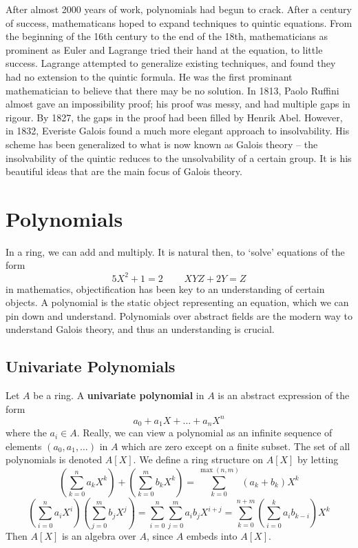 After almost 2000 years of work, polynomials had begun to crack. After a century of success, mathematicans hoped to expand techniques to quintic equations. From the beginning of the 16th century to the end of the 18th, mathematicians as prominent as Euler and Lagrange tried their hand at the equation, to little success. Lagrange attempted to generalize existing techniques, and found they had no extension to the quintic formula. He was the first prominant mathematician to believe that there may be no solution. In 1813, Paolo Ruffini almost gave an impossibility proof; his proof was messy, and had multiple gaps in rigour. By 1827, the gaps in the proof had been filled by Henrik Abel. However, in 1832, Everiste Galois found a much more elegant approach to insolvability. His scheme has been generalized to what is now known as Galois theory -- the insolvability of the quintic reduces to the unsolvability of a certain group. It is his beautiful ideas that are the main focus of Galois theory.









\chapter{Polynomials}

In a ring, we can add and multiply. It is natural then, to `solve' equations of the form
%
\[ 5 X^2 + 1 = 2\ \ \ \ \ \ \ \ \ \ XYZ + 2Y = Z \]
%
in mathematics, objectification has been key to an understanding of certain objects. A polynomial is the static object representing an equation, which we can pin down and understand. Polynomials over abstract fields are the modern way to understand Galois theory, and thus an understanding is crucial.

\section{Univariate Polynomials}

Let $A$ be a ring. A {\bf univariate polynomial} in $A$ is an abstract expression of the form
%
\[ a_0 + a_1 X + \dots + a_n X^n \]
%
where the $a_i \in A$. Really, we can view a polynomial as an infinite sequence of elements $(a_0, a_1, \dots)$ in $A$ which are zero except on a finite subset. The set of all polynomials is denoted $A[X]$. We define a ring structure on $A[X]$ by letting
%
\[ \left( \sum_{k = 0}^n a_k X^k \right) + \left( \sum_{k = 0}^m b_k X^k \right) = \sum_{k = 0}^{\max(n,m)} (a_k + b_k) X^k \]
%
\[ \left( \sum_{i = 0}^n a_i X^i \right) \left( \sum_{j = 0}^m b_j X^j \right) = \sum_{i = 0}^n \sum_{j = 0}^m a_i b_j X^{i + j} = \sum_{k = 0}^{n + m} \left( \sum_{i = 0}^k a_i b_{k - i} \right) X^k \]
%
Then $A[X]$ is an algebra over $A$, since $A$ embeds into $A[X]$.

